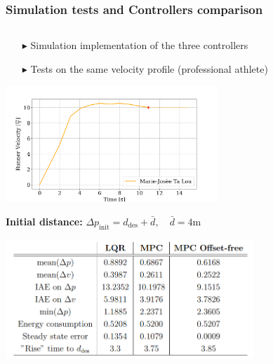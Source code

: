 \documentclass[9pt, aspectratio=169]{beamer}
\begin{document}
\begin{frame}
\frametitle{Simulation tests and Controllers comparison}
\begin{columns}
\begin{column}{0.57\textwidth}
\centering
{}\begin{block}{}
\begin{itemize}
\footnotesize
	\item[$\blacktriangleright$] Simulation implementation of the three controllers
	\item[$\blacktriangleright$] Tests on the same velocity profile (professional athlete)
\end{itemize}
\end{block}
\vspace{-0.2cm}
	\begin{center}
  		\includegraphics[width=0.6\textwidth]{Test_Velocities} 
	\end{center}
\textbf{Initial distance:}
\centering
{}$\Delta p_\text{init} = d_\text{des} + \bar{d}, \quad \bar{d}= 4$m
	\begin{center}
  		\includegraphics[width=0.7\textwidth]{Ta_Lou/Table} 
	\end{center}



\end{column}
\end{columns}
\end{frame}
\end{document}
